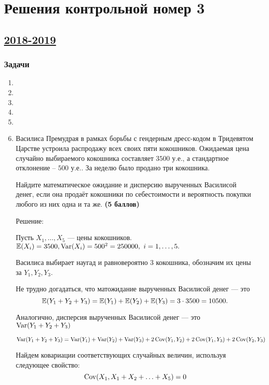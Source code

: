 \thispagestyle{empty}
\section{Решения контрольной номер 3}

\subsection[2018-2019]{\hyperref[sec:kr_03_2018_2019]{2018-2019}}
\label{sec:sol_kr_03_2018_2019}
\subsubsection*{Задачи}
\begin{enumerate}[resume]
	
  \item
  \item
  \item
  \item
  \item
	\item Василиса Премудрая в рамках борьбы с гендерным дресс-кодом в Тридевятом Царстве устроила распродажу всех своих пяти
   кокошников. Ожидаемая цена случайно выбираемого кокошника составляет $3500$ у.е., а стандартное отклонение – $500$ у.е.. 
   За неделю было продано три кокошника.
	
	Найдите математическое ожидание и дисперсию вырученных Василисой денег, 
  если она продаёт кокошники по себестоимости и вероятность покупки любого из них одна и та же. \textbf{(5 баллов)}

	 Решение: 

	Пусть $ X_1, \ldots, X_5$ — цены кокошников. $ \operatorname{\mathbb{E}} (X_i) = 3500, \operatorname{Var} (X_i) = 500^2 = 250000, \ i = 1, \ldots , 5.$

 Василиса выбирает наугад и равновероятно 3 кокошника, обозначим их цены за $ Y_1, Y_2, Y_3. $

Не трудно догадаться, что матожидание вырученных Василисой денег — это  \[ \operatorname{\mathbb{E}} (Y_1 + Y_2 + Y_3) = 
\operatorname{\mathbb{E}} (Y_1)  + \operatorname{\mathbb{E}} (Y_2) + \operatorname{\mathbb{E}} (Y_3) = 3 \cdot 3500 = 10500.\] 

 Аналогично, дисперсия вырученных Василисой денег — это $\operatorname{Var} (Y_1 + Y_2 + Y_3)$ 

\[ \operatorname{Var} (Y_1 + Y_2 + Y_3) = \operatorname{Var} (Y_1) + \operatorname{Var} (Y_2) + \operatorname{Var} (Y_3) + 2 \operatorname{Cov} (Y_1, Y_2) + 2 \operatorname{Cov} (Y_1, Y_3) + 2 \operatorname{Cov} (Y_2, Y_3)\]

 Найдем ковариации соответствующих случайных величин, используя следующее свойство: 
 \[ \operatorname{Cov} (X_1, X_1 + X_2 + \ldots + X_5) = 0\]


\end{enumerate}
